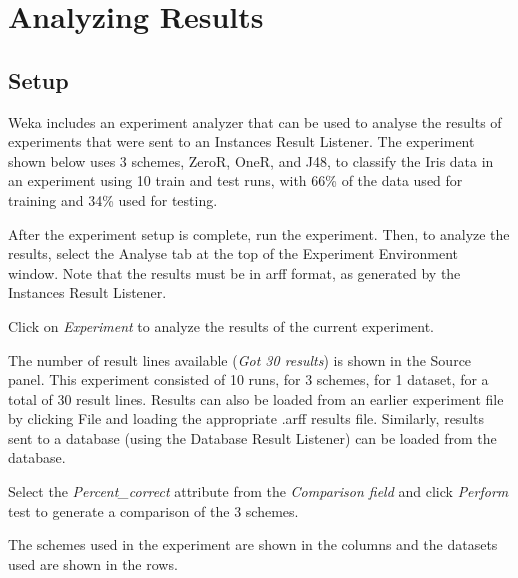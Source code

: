 \documentclass[a4paper]{article}
\begin{document}

\newpage
\section{Analyzing Results}

\subsection{Setup}

Weka includes an experiment analyzer that can be used to analyse the results of experiments that were sent to an Instances Result Listener. The experiment shown below uses 3 schemes, ZeroR, OneR, and J48, to classify the Iris data in an experiment using 10 train and test runs, with 66\% of the data used for training and 34\% used for testing.
\begin{center}
\end{center}

After the experiment setup is complete, run the experiment. Then, to analyze the results, select the Analyse tab at the top of the Experiment Environment window. Note that the results must be in arff format, as generated by the Instances Result Listener.

Click on \textit{Experiment} to analyze the results of the current experiment.
\begin{center}
\end{center}

The number of result lines available (\textit{Got 30 results}) is shown in the Source panel. This experiment consisted of 10 runs, for 3 schemes, for 1 dataset, for a total of 30 result lines. Results can also be loaded from an earlier experiment file by clicking File and loading the appropriate .arff results file. Similarly, results sent to a database (using the Database Result Listener) can be loaded from the database.

Select the \textit{Percent\_correct} attribute from the \textit{Comparison field} and click \textit{Perform} test to generate a comparison of the 3 schemes.
\begin{center}
\end{center}

The schemes used in the experiment are shown in the columns and the datasets used are shown in the rows.
\end{document}
